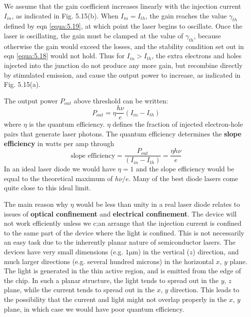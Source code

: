 \documentclass[12pt]{book}
\begin{document}
{We assume that the gain coefficient increases linearly with the injection current $I_{in}$, as indicated in Fig. 5.15(b). When $I_{in} = I_{th}$, the gain reaches the value $\gamma_{th}$ defined by eqn \ref{equa:5.19}, at which point the laser begins to oscillate. Once the laser is oscillating, the gain must be clamped at the value of $\gamma_{th}$, because otherwise the gain would exceed the losses, and the stability condition set out in eqn \ref{equa:5.18} would not hold. Thus for $I_{in} > I_{th}$, the extra electrons and holes injected into the junction do not produce any more gain, but recombine directly by stimulated emission, and cause the output power to increase, as indicated in Fig. 5.15(a).

The output power $P_{out}$ above threshold can be written:
\begin{equation}\label{equa:5.20}
  P_{out}=\eta\frac{h\nu}{e}(I_{in}-I_{th})
\end{equation}
where $\eta$ is the quantum efficiency. $\eta$ defines the fraction of injected electron-hole pairs that generate laser photons. The quantum efficiency determines the \textbf{slope efficiency} in watts per amp through
\begin{equation}\label{equa:5.21}
  \text{slope efficiency}=\frac{P_{out}}{(I_{in}-I_{th})}=\frac{\eta h\nu}{e}
\end{equation}
In an ideal laser diode we would have $\eta=1$ and the slope efficiency would be equal to the theoretical maximum of $h\nu/e$. Many of the best diode lasers come quite close to this ideal limit.

The main reason why $\eta$ would be less than unity in a real laser diode relates to issues of \textbf{optical confinement} and \textbf{electrical confinement}. The device will not work efficiently unless we c;an arrange that the injection current is confined to the same part of the device where the light is confined. This is not necessarily an easy task due to the inherently planar nature of semiconductor lasers. The devices have very small dimensions (e.g. $\mathrm{1\mu m}$) in the vertical ($z$) direction, and much larger directions (e.g. several hundred microns) in the horizontal $x$, $y$ plane. The light is generated in the thin active region, and is emitted from the edge of the chip. In such a planar structure, the light tends to spread out in the $y$, $z$ plane, while the current tends to spread out in the $x$, $y$ direction. This leads to the possibility that the current and light might not overlap properly in the $x$, $y$ plane, in which case we would have poor quantum efficiency.

}
\end{document}
